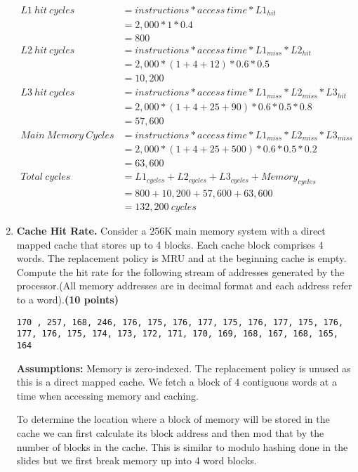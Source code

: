 \documentclass[a4paper, 11pt]{exam}
\begin{document}
\begin{enumerate}
\begin{align*}
L1 \ hit \ cycles &= instructions * access \ time * L1_{hit} \\ 
            &= 2,000 * 1 * 0.4 \\
            &= 800 \\
L2 \ hit \ cycles &= instructions * access \ time * L1_{miss} * L2_{hit} \\
            &= 2,000 * (1 + 4 + 12) * 0.6 * 0.5\\
            &= 10,200 \\
L3 \ hit \ cycles &= instructions * access \ time * L1_{miss} * L2_{miss} * L3_{hit}\\
            &= 2,000 * (1 + 4 + 25 + 90) * 0.6 * 0.5 * 0.8\\
            &= 57,600\\
Main \ Memory \ Cycles &= instructions * access \ time * L1_{miss} * L2_{miss} * L3_{miss} \\
                       &= 2,000 * (1 + 4 + 25 + 500) * 0.6 * 0.5 * 0.2\\
                       &= 63,600\\
Total \ cycles &= L1_{cycles} + L2_{cycles} + L3_{cycles} + Memory_{cycles}\\
               &= 800 + 10,200 + 57,600 + 63,600 \\
               &= 132,200 \ cycles                      
\end{align*}

\newpage
\item \textbf{Cache Hit Rate.}
Consider a 256K main memory system with a direct mapped cache that stores up to 4 blocks. Each cache block comprises 4 words. The replacement policy is MRU and at the beginning cache is empty. Compute the hit rate for the following stream of addresses generated by the processor.(All memory addresses are in decimal format and each address refer to a word).\textbf{(10 points)}

\texttt{170 , 257, 168, 246, 176, 175, 176, 177, 175, 176, 177, 175, 176, 177, 176, 175, 174, 173, 172, 171, 170, 169, 168, 167, 168, 165, 164}

\textbf{Assumptions:} Memory is zero-indexed. The replacement policy is unused as this is a direct mapped cache. We fetch a block of 4 contiguous words at a time when accessing memory and caching.

To determine the location where a block of memory will be stored in the cache we can first calculate its block address and then mod that by the number of blocks in the cache. This is similar to modulo hashing done in the slides but we first break memory up into 4 word blocks.


\end{enumerate}
\end{document}
